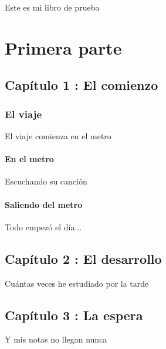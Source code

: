 \documentclass[10pt,a4paper]{book}
\begin{document}
Este es mi libro de prueba
\part{Primera parte}
\chapter{Capítulo 1 : El comienzo}
\section{El viaje}
El viaje comienza en el metro 
\subsection{ En el metro} 
Escuchando su canción 

\subsection{Saliendo del metro}
Todo empezó el día...


\chapter{Capítulo 2 : El desarrollo}
Cuántas veces he estudiado por la tarde
\chapter{Capítulo 3 : La espera}
Y mis notas no llegan nunca
\end{document}
